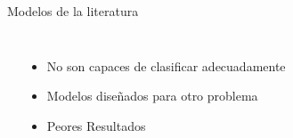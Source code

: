 \begin{frame}{Modelos de la literatura}
\begin{columns}
        \begin{table}[H]
        \vspace{-1cm}
        \caption{OhShuLi}
        \begin{center}
        \end{center}
        \end{table}
        
    \begin{itemize}
        \item No son capaces de clasificar adecuadamente
        \item Modelos diseñados para otro problema
        \item Peores Resultados
    \end{itemize}
\end{columns}       
\end{frame}



